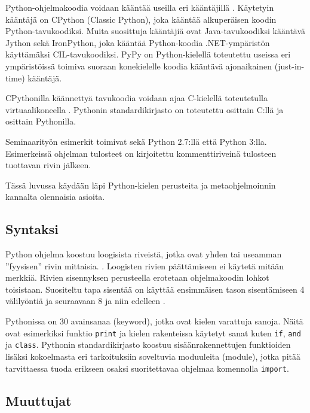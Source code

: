 \documentclass[finnish]{tktltiki2}
\theoremstyle{definition}
\theoremstyle{remark}
\begin{document}
Python-ohjelmakoodia voidaan kääntää useilla eri kääntäjillä \cite{martelli2006python}. Käytetyin kääntäjä on CPython (Classic Python), joka kääntää alkuperäisen koodin Python-tavukoodiksi. Muita suosittuja kääntäjiä ovat Java-tavukoodiksi kääntävä Jython sekä IronPython, joka kääntää Python-koodia .NET-ympäristön käyttämäksi CIL-tavukoodiksi. PyPy on Python-kielellä toteutettu useissa eri ympäristöissä toimiva suoraan konekielelle koodia kääntävä ajonaikainen (just-in-time) kääntäjä. %

CPythonilla käännettyä tavukoodia voidaan ajaa C-kielellä toteutetulla virtuaalikoneella \cite{martelli2006python}. Pythonin standardikirjasto on toteutettu osittain C:llä ja osittain Pythonilla.

Seminaarityön esimerkit toimivat sekä Python 2.7:llä että Python 3:lla. Esimerkeissä ohjelman tulosteet on kirjoitettu kommenttiriveinä tulosteen tuottavan rivin jälkeen.

Tässä luvussa käydään läpi Python-kielen perusteita ja metaohjelmoinnin kannalta olennaisia asioita.

\subsection{Syntaksi}

Python ohjelma koostuu loogisista riveistä, jotka ovat yhden tai useamman ''fyysisen'' rivin mittaisia. \cite{martelli2006python}. Loogisten rivien päättämiseen ei käytetä mitään merkkiä. Rivien sisennyksen perusteella erotetaan ohjelmakoodin lohkot toisistaan. Suositeltu tapa sisentää on käyttää ensimmäisen tason sisentämiseen 4 välilyöntiä ja seuraavaan 8 ja niin edelleen \cite{pep8}. 


Pythonissa on 30 avainsanaa (keyword), jotka ovat kielen varattuja sanoja. Näitä ovat esimerkiksi funktio \verb|print| ja kielen rakenteissa käytetyt sanat kuten \verb|if|, \verb|and| ja \verb|class|. Pythonin standardikirjasto koostuu sisäänrakennettujen funktioiden lisäksi kokoelmasta eri tarkoituksiin soveltuvia moduuleita (module), jotka pitää tarvittaessa tuoda erikseen osaksi suoritettavaa ohjelmaa komennolla \verb|import|.

\subsection{Muuttujat}
\end{document}
